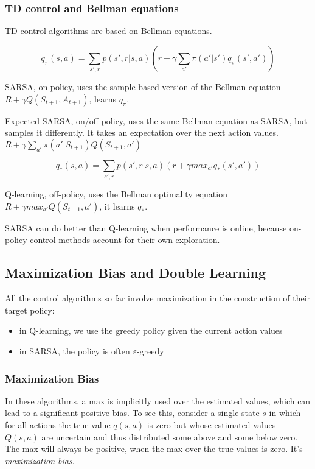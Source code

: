 \documentclass[sutton_barto_notes.tex]{subfiles}
\begin{document}
\subsubsection{TD control and Bellman equations}

TD control algorithms are based on Bellman equations.

$$q_\pi(s,a) = \sum_{s',r} p(s',r|s,a) (r + \gamma \sum_{a'} \pi(a'|s')q_\pi(s',a'))$$

SARSA, on-policy, uses the sample based version of the Bellman equation $R + \gamma Q(S_{t+1}, A_{t+1})$, learns $q_\pi$.

Expected SARSA, on/off-policy, uses the same Bellman equation as SARSA, but samples it differently. It takes an expectation over the next action values. $R+\gamma\sum_{a'}\pi(a'|S_{t+1})Q(S_{t+1},a')$

$$q_*(s,a) = \sum_{s',r} p(s',r|s,a) (r+\gamma max_{a'} q_* (s',a'))$$

Q-learning, off-policy, uses the Bellman optimality equation $R + \gamma max_{a'} Q(S_{t+1},a')$, it learns $q_*$.

SARSA can do better than Q-learning when performance is online, because on-policy control methods account for their own exploration.

\subsection{Maximization Bias and Double Learning}

All the control algorithms so far involve maximization in the construction of their target policy:
\begin{itemize}
\item in Q-learning, we use the greedy policy given the current action values
\item in SARSA, the policy is often $\varepsilon$-greedy
\end{itemize}

\subsubsection{Maximization Bias}

In these algorithms, a max is implicitly used over the estimated values, which can lead to a significant positive bias. To see this, consider a single state $s$ in which for all actions the true value $q(s,a)$ is zero but whose estimated values $Q(s,a)$ are uncertain and thus distributed some above and some below zero. The max will always be positive, when the max over the true values is zero. It's \textit{maximization bias}.
\end{document}
